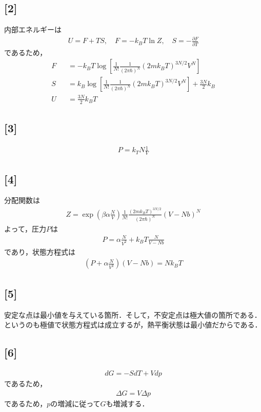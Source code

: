 \documentclass[12pt,dvipdfmx]{jsarticle}
\begin{document}
\subsection*{\large{[2]}}
内部エネルギーは
\begin{eqnarray}
  U = F+TS,\quad F = -k_BT\ln Z, \quad S=-\frac{\partial F}{\partial T}
\end{eqnarray}
であるため，
\begin{eqnarray}
  F &&= -k_BT \log\left[ \frac{1}{N!}\frac{1}{(2\pi\hbar)^N} (2mk_B T)^{3N/2} V^N\right]\\
  S &&= k_B\log\left[ \frac{1}{N!}\frac{1}{(2\pi\hbar)^N} (2mk_B T)^{3N/2} V^N\right]+ \frac{3N}{2}k_B\\
  U &&= \frac{3N}{2}k_BT
\end{eqnarray}
\subsection*{\large{[3]}}
\begin{eqnarray}
  P = k_TN\frac{1}{V}
\end{eqnarray}
\subsection*{\large{[4]}}
分配関数は
\begin{eqnarray}
  Z = \exp\left( \beta\alpha\frac{N}{V} \right)\frac{1}{N!}\frac{(2mk_BT)^{3N/2}}{(2\pi\hbar)^N}(V-Nb)^N
\end{eqnarray}
よって，圧力$P$は
\begin{eqnarray}
  P =\alpha\frac{N}{V^2} + k_B T \frac{N}{V-Nb}
\end{eqnarray}
であり，状態方程式は
\begin{eqnarray}
  \left( P + \alpha\frac{N}{V^2} \right)(V-Nb) = Nk_B T
\end{eqnarray}
\subsection*{\large{[5]}}
安定な点は最小値を与えている箇所．そして，不安定点は極大値の箇所である．というのも極値で状態方程式は成立するが，熱平衡状態は最小値だからである．
\subsection*{\large{[6]}}
\begin{eqnarray}
  dG= -SdT + Vdp
\end{eqnarray}
であるため，
\begin{eqnarray}
  \Delta G = V\Delta p
\end{eqnarray}
であるため，$p$の増減に従って$G$も増減する．
\newpage
\end{document}
